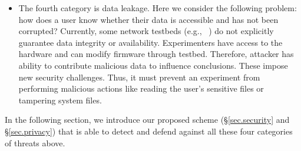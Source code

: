 \begin{itemize}
\item The fourth category is data leakage. Here we consider the following problem: how does a user know whether their data is accessible and has not been corrupted? Currently, some network testbeds (e.g., ~\cite{183951}) do not explicitly guarantee data integrity or availability. Experimenters have access to the hardware and can modify firmware through testbed. Therefore, attacker has ability to contribute malicious data to influence conclusions. These impose new security challenges. Thus, it must prevent an experiment from performing malicious actions like reading the user's sensitive files or tampering system files.
\end{itemize}

In the following section, we introduce our proposed scheme (\S{\ref{sec.security}} and \S{\ref{sec.privacy}}) that is able to detect and defend against all these four categories of threats above.